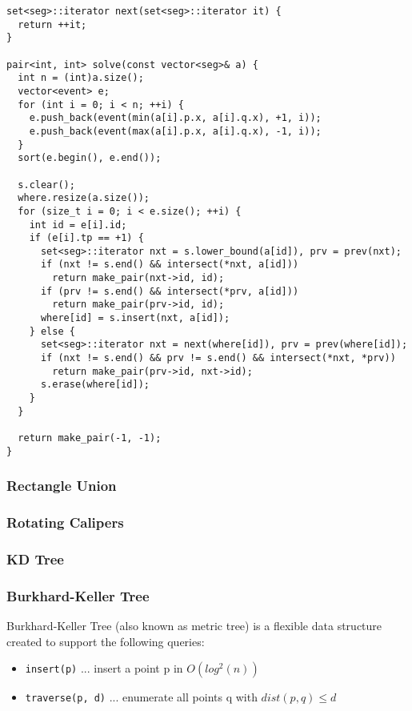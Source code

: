 \begin{center}
\begin{minipage}[t]{0.5\linewidth}
\begin{lstlisting}
set<seg>::iterator next(set<seg>::iterator it) {
  return ++it;
}

pair<int, int> solve(const vector<seg>& a) {
  int n = (int)a.size();
  vector<event> e;
  for (int i = 0; i < n; ++i) {
    e.push_back(event(min(a[i].p.x, a[i].q.x), +1, i));
    e.push_back(event(max(a[i].p.x, a[i].q.x), -1, i));
  }
  sort(e.begin(), e.end());

  s.clear();
  where.resize(a.size());
  for (size_t i = 0; i < e.size(); ++i) {
    int id = e[i].id;
    if (e[i].tp == +1) {
      set<seg>::iterator nxt = s.lower_bound(a[id]), prv = prev(nxt);
      if (nxt != s.end() && intersect(*nxt, a[id]))
        return make_pair(nxt->id, id);
      if (prv != s.end() && intersect(*prv, a[id]))
        return make_pair(prv->id, id);
      where[id] = s.insert(nxt, a[id]);
    } else {
      set<seg>::iterator nxt = next(where[id]), prv = prev(where[id]);
      if (nxt != s.end() && prv != s.end() && intersect(*nxt, *prv))
        return make_pair(prv->id, nxt->id);
      s.erase(where[id]);
    }
  }

  return make_pair(-1, -1);
}
\end{lstlisting}
\end{minipage}
\end{center}
  
\subsubsection{Rectangle Union}
\subsubsection{Rotating Calipers}
\subsubsection{KD Tree}

\newpage
\subsubsection{Burkhard-Keller Tree}

Burkhard-Keller Tree \cite{Burkhard1973Apr} (also known as metric tree) is a flexible data structure
created to support the following queries:

{
\begin{itemize}
  \item{\lstinline{insert(p)} ... insert a point p in $O(log^2(n))$}
  \item{\lstinline{traverse(p, d)} ... enumerate all points q with $dist(p, q) \leq d$}
\end{itemize}
}

